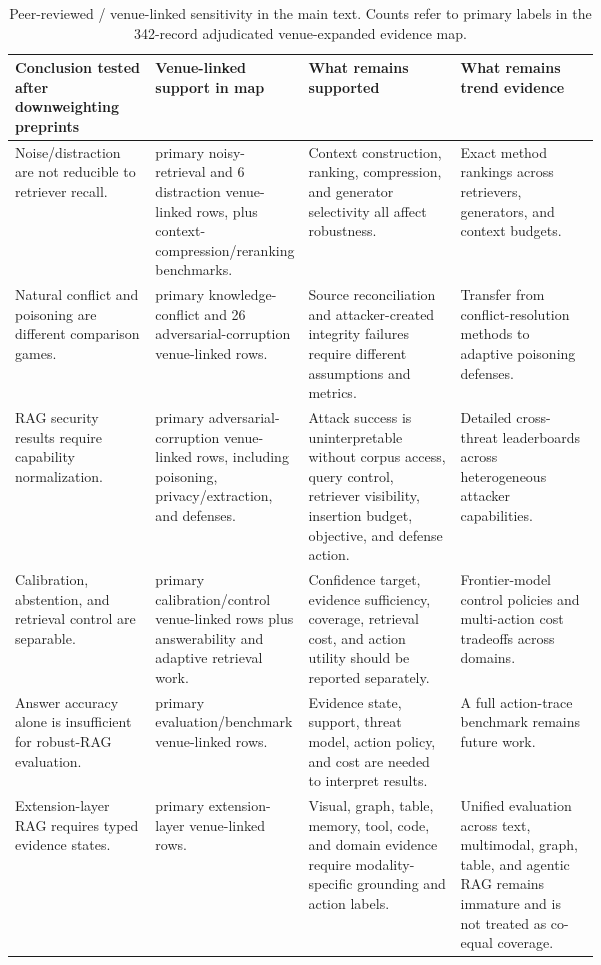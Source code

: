 \documentclass[11pt]{article}
\begin{document}
\begin{table}[t]
\centering
\scriptsize
\renewcommand{\arraystretch}{0.88}
\begin{tabularx}{\linewidth}{>{\raggedright\arraybackslash}p{0.24\linewidth}>{\raggedright\arraybackslash}p{0.18\linewidth}>{\raggedright\arraybackslash}p{0.26\linewidth}X}
\toprule
\textbf{Conclusion tested after downweighting preprints} & \textbf{Venue-linked support in map} & \textbf{What remains supported} & \textbf{What remains trend evidence} \\
\midrule
Noise/distraction are not reducible to retriever recall. & 22 primary noisy-retrieval and 6 distraction venue-linked rows, plus context-compression/reranking benchmarks. & Context construction, ranking, compression, and generator selectivity all affect robustness. & Exact method rankings across retrievers, generators, and context budgets. \\
Natural conflict and poisoning are different comparison games. & 16 primary knowledge-conflict and 26 adversarial-corruption venue-linked rows. & Source reconciliation and attacker-created integrity failures require different assumptions and metrics. & Transfer from conflict-resolution methods to adaptive poisoning defenses. \\
RAG security results require capability normalization. & 26 primary adversarial-corruption venue-linked rows, including poisoning, privacy/extraction, and defenses. & Attack success is uninterpretable without corpus access, query control, retriever visibility, insertion budget, objective, and defense action. & Detailed cross-threat leaderboards across heterogeneous attacker capabilities. \\
Calibration, abstention, and retrieval control are separable. & 20 primary calibration/control venue-linked rows plus answerability and adaptive retrieval work. & Confidence target, evidence sufficiency, coverage, retrieval cost, and action utility should be reported separately. & Frontier-model control policies and multi-action cost tradeoffs across domains. \\
Answer accuracy alone is insufficient for robust-RAG evaluation. & 28 primary evaluation/benchmark venue-linked rows. & Evidence state, support, threat model, action policy, and cost are needed to interpret results. & A full action-trace benchmark remains future work. \\
Extension-layer RAG requires typed evidence states. & 6 primary extension-layer venue-linked rows. & Visual, graph, table, memory, tool, code, and domain evidence require modality-specific grounding and action labels. & Unified evaluation across text, multimodal, graph, table, and agentic RAG remains immature and is not treated as co-equal coverage. \\
\bottomrule
\end{tabularx}
\caption{Peer-reviewed / venue-linked sensitivity in the main text. Counts refer to primary labels in the 342-record adjudicated venue-expanded evidence map.}
\label{tab:main-peer-sensitivity}
\end{table}
\end{document}
